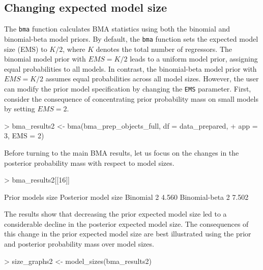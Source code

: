 \documentclass[a4paper]{article}
\begin{document}
\subsection{Changing expected model size}\label{ems}
The \verb+bma+ function calculates BMA statistics using both the binomial and binomial-beta model priors. By default, the \verb+bma+ function sets the expected model size (EMS) to $K/2$, where $K$ denotes the total number of regressors. The binomial model prior with $EMS = K/2$ leads to a uniform model prior, assigning equal probabilities to all models. In contrast, the binomial-beta model prior with $EMS = K/2$ assumes equal probabilities across all model sizes. However, the user can modify the prior model specification by changing the \verb+EMS+ parameter. First, consider the consequence of concentrating prior probability mass on small models by setting $EMS = 2$.
\begin{Schunk}
\begin{Sinput}
> bma_results2 <- bma(bma_prep_objects_full, df = data_prepared,
+                     app = 3, EMS = 2)
\end{Sinput}
\end{Schunk}
Before turning to the main BMA results, let us focus on the changes in the posterior probability mass with respect to model sizes.
\begin{Schunk}
\begin{Sinput}
> bma_results2[[16]]
\end{Sinput}
\begin{Soutput}
              Prior models size Posterior model size
Binomial                      2                4.560
Binomial-beta                 2                7.502
\end{Soutput}
\end{Schunk}
The results show that decreasing the prior expected model size led to a considerable decline in the posterior expected model size. The consequences of this change in the prior expected model size are best illustrated using the prior and posterior probability mass over model sizes.
\begin{Schunk}
\begin{Sinput}
> size_graphs2 <- model_sizes(bma_results2)
\end{Sinput}
\end{Schunk}
\end{document}
